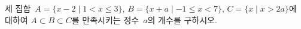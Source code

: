 세 집합~$A=\{x-2 \mid 1<x\le 3\}$, $B=\{x+a \mid -1\le x<7\}$, $C=\{x \mid x>2a\}$에 대하여 $A\subset B\subset C$를 만족시키는 정수~$a$의 개수를 구하시오.
